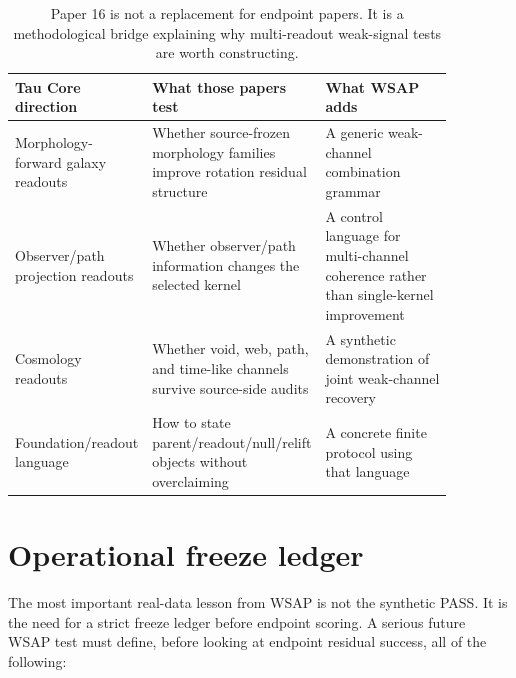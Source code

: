 \documentclass[12pt]{article}
\begin{document}
\begin{table}[t]
\centering
\small
\begin{tabular}{L{0.23\linewidth}L{0.32\linewidth}L{0.32\linewidth}}
\toprule
Tau Core direction & What those papers test & What WSAP adds\\
\midrule
Morphology-forward galaxy readouts & Whether source-frozen morphology
families improve rotation residual structure & A generic weak-channel
combination grammar\\
Observer/path projection readouts & Whether observer/path information changes
the selected kernel & A control language for multi-channel coherence rather
than single-kernel improvement\\
Cosmology readouts & Whether void, web, path, and time-like channels
survive source-side audits & A synthetic demonstration of joint weak-channel
recovery\\
Foundation/readout language & How to state parent/readout/null/relift objects
without overclaiming & A concrete finite protocol using that language\\
\bottomrule
\end{tabular}
\caption{Paper 16 is not a replacement for endpoint papers.  It is a
methodological bridge explaining why multi-readout weak-signal tests are worth
constructing.}
\label{tab:sequence}
\end{table}

\section{Operational freeze ledger}

The most important real-data lesson from WSAP is not the synthetic PASS.  It is
the need for a strict freeze ledger before endpoint scoring.  A serious future
WSAP test must define, before looking at endpoint residual success, all of the
following:
\end{document}
